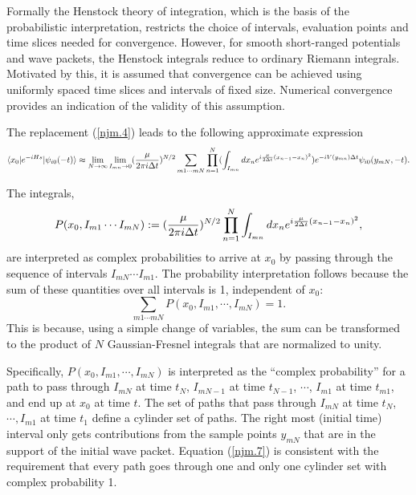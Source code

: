 \documentclass[aps,prc,reprint,noshowpacs,groupedaddress,onecolumn]{revtex4}
\def\beq{\begin{equation}}
\def\eeq{\end{equation}}
\begin{document}
Formally the Henstock theory of integration, which is the basis of the 
probabilistic interpretation,  restricts the choice of
intervals, evaluation points and time slices needed for convergence.
However, for smooth short-ranged potentials and wave packets, the
Henstock integrals reduce to ordinary Riemann integrals.  Motivated by
this, it is assumed that convergence can be achieved using
uniformly spaced time slices and intervals of fixed size.  Numerical
convergence provides an indication of the validity of this assumption.
  

The replacement (\ref{njm.4}) leads to the following approximate expression
\beq
\langle x_0 \vert e^{-iHs} \vert \psi_{i0}(-t) \rangle \approx
\lim_{N\to \infty} \lim_{I_{mn}\to 0} 
({ \mu \over 2 \pi i \Delta t})^{N/2}
\sum_{m1 \cdots mN} \prod_{n=1}^N 
(
\int_{I_{mn}}
dx_n
e^{
i {\mu \over 2\Delta t} (x_{n-1}-x_n)^2}
)
e^{-i V(y_{mn}) \Delta t }
\psi_{i0} (y_{mN},-t).  
\label{njm.5}
\eeq

The integrals, 
\beq
P(x_0,I_{m1} \cdots I_{mN}) := 
({\mu \over 2 \pi i \Delta t})^{N/2}
\prod_{n=1}^N  \int_{I_{mn}} dx_n
e^{
i {\mu \over 2\Delta t} (x_{n-1}-x_{n})^2},  
\label{njm.6}
\eeq
are interpreted as complex probabilities to arrive at $x_0$ by passing
through the sequence of intervals $I_{mN} \cdots I_{m1}$. 
The probability interpretation follows because the sum of these quantities
over all intervals is 1, independent of $x_0$:
\beq
\sum_{{m1} \cdots {mN}} 
P(x_0,I_{m1}, \cdots ,I_{mN}) = 1 .
\label{njm.7}
\eeq
This is because, using a simple change of variables, 
the sum can be transformed to the product of $N$ Gaussian-Fresnel 
integrals that are normalized to unity.   

Specifically, $P(x_0,I_{m1}, \cdots ,I_{mN})$ is interpreted as the
``complex probability'' for a path to pass through $I_{mN}$ at time
$t_N$, $I_{mN-1}$ at time $t_{N-1}$, $\cdots$, $I_{m1}$ at time
$t_{m1}$, and end up at $x_0$ at time $t$.  The set of
paths that pass through $I_{mN}$ at time $t_N$, $ \cdots , I_{m1}$ at
time $t_1$ define a cylinder set of paths.  The right most
(initial time) interval only gets contributions from the sample points
$y_{mN}$ that are in the support of the initial wave packet.  Equation
(\ref{njm.7}) is consistent with the requirement that every
path goes through one and only one cylinder set with complex
probability 1.
\end{document}
